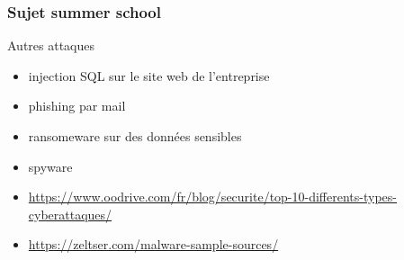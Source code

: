 \documentclass{beamer}
\begin{document}
		\begin{frame}
			\frametitle{Sujet summer school}
			\begin{block}{Autres attaques}
				\begin{itemize}
					\item injection SQL sur le site web de l'entreprise
					\item phishing par mail
					\item ransomeware sur des données sensibles
					\item spyware
				\end{itemize}
			\end{block}
		\end{frame}
	\begin{frame}
		\begin{itemize}
			\item \url{https://www.oodrive.com/fr/blog/securite/top-10-differents-types-cyberattaques/}
			\item \url{https://zeltser.com/malware-sample-sources/}
		\end{itemize}
	\end{frame}
\end{document}
